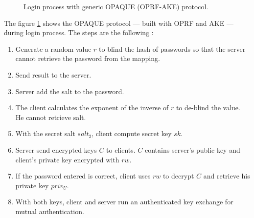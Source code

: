 \documentclass[../report.tex]{subfiles}
\begin{document}
\begin{figure}[h]
 \centering

 \setlength{\fboxsep}{10pt}
 \setlength{\fboxrule}{1pt}

 \caption{Login process with generic OPAQUE (OPRF-AKE) protocol.}
 \label{fig:OPAQUE_AKE}
\end{figure}

The figure \ref{fig:OPAQUE_AKE} shows the OPAQUE protocol --- built with OPRF and AKE --- during login process.
The steps are the following :


\begin{enumerate}
 \item Generate a random value $r$ to blind the hash of passwords so that the server cannot retrieve the password from the mapping.
 \item Send result to the server.
 \item Server add the salt to the password.
 \item The client calculates the exponent of the inverse of $r$ to de-blind the value. He cannot retrieve salt.
 \item With the secret salt $salt_2$, client compute secret key $sk$.
 \item Server send encrypted keys $C$ to clients. $C$ contains server's public key and client's private key encrypted with $rw$.
 \item If the password entered is correct, client uses $rw$ to decrypt $C$ and retrieve his private key $priv_U$.
 \item With both keys, client and server run an authenticated key exchange for mutual authentication.
\end{enumerate}
\end{document}
